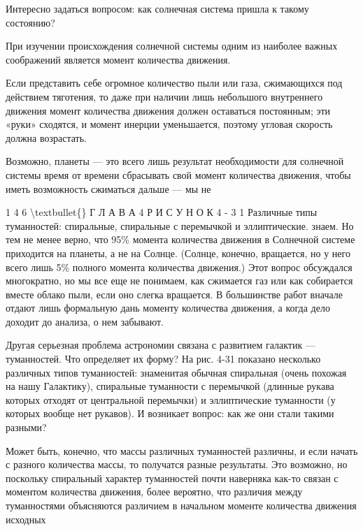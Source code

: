\documentclass[10pt,oneside]{article}
\begin{document}
Интересно задаться вопросом: как солнечная система пришла к такому состоянию?\par

При изучении происхождения солнечной системы одним из наиболее важных соображений является момент количества движения.\par

Если представить себе огромное количество пыли или газа, сжимающихся под действием тяготения, то даже при наличии лишь небольшого внутреннего движения момент количества движения должен оставаться постоянным; эти «руки» сходятся, и момент инерции уменьшается, поэтому угловая скорость должна возрастать.\par

Возможно, планеты --- это всего лишь результат необходимости для солнечной системы время от времени сбрасывать свой момент количества движения, чтобы иметь возможность сжиматься дальше --- мы не\par

1 4 6 \textbackslash{}textbullet\{\} Г Л А В А  4 Р И С У Н О К  4 - 3 1 Различные типы туманностей: спиральные, спиральные с перемычкой и эллиптические. знаем. Но тем не менее верно, что 95\% момента количества движения в Солнечной системе приходится на планеты, а не на Солнце. (Солнце, конечно, вращается, но у него всего лишь 5\% полного момента количества движения.) Этот вопрос обсуждался многократно, но мы все еще не понимаем, как сжимается газ или как собирается вместе облако пыли, если оно слегка вращается. В большинстве работ вначале отдают лишь формальную дань моменту количества движения, а когда дело доходит до анализа, о нем забывают.\par

Другая серьезная проблема астрономии связана с развитием галактик --- туманностей. Что определяет их форму? На рис. 4-31 показано несколько различных типов туманностей: знаменитая обычная спиральная (очень похожая на нашу Галактику), спиральные туманности с перемычкой (длинные рукава которых отходят от центральной перемычки) и эллиптические туманности (у которых вообще нет рукавов). И возникает вопрос: как же они стали такими разными?\par

Может быть, конечно, что массы различных туманностей различны, и если начать с разного количества массы, то получатся разные результаты. Это возможно, но поскольку спиральный характер туманностей почти наверняка как-то связан с моментом количества движения, более вероятно, что различия между туманностями объясняются различием в начальном моменте количества движения исходных\par
\end{document}
